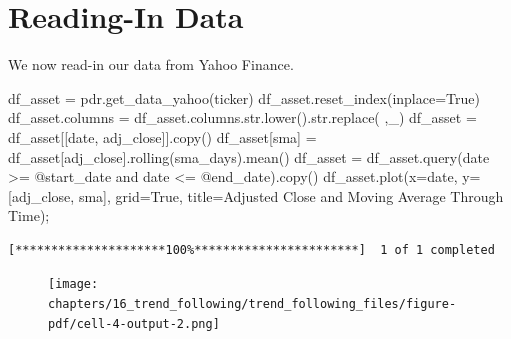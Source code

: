 \documentclass[
  letterpaper,
  DIV=11,
  numbers=noendperiod]{scrreprt}
\newenvironment{Shaded}{\begin{snugshade}}{\end{snugshade}}
\newcommand{\BuiltInTok}[1]{\textcolor[rgb]{0.00,0.23,0.31}{#1}}
\newcommand{\NormalTok}[1]{\textcolor[rgb]{0.00,0.23,0.31}{#1}}
\newcommand{\OperatorTok}[1]{\textcolor[rgb]{0.37,0.37,0.37}{#1}}
\newcommand{\StringTok}[1]{\textcolor[rgb]{0.13,0.47,0.30}{#1}}
\newcommand{\VariableTok}[1]{\textcolor[rgb]{0.07,0.07,0.07}{#1}}
\begin{document}
\hypertarget{reading-in-data-10}{%
\section{Reading-In Data}\label{reading-in-data-10}}

We now read-in our data from Yahoo Finance.

\begin{Shaded}
\begin{Highlighting}[]
\NormalTok{df\_asset }\OperatorTok{=}\NormalTok{ pdr.get\_data\_yahoo(ticker)}
\NormalTok{df\_asset.reset\_index(inplace}\OperatorTok{=}\VariableTok{True}\NormalTok{)}
\NormalTok{df\_asset.columns }\OperatorTok{=}\NormalTok{ df\_asset.columns.}\BuiltInTok{str}\NormalTok{.lower().}\BuiltInTok{str}\NormalTok{.replace(}\StringTok{\textquotesingle{} \textquotesingle{}}\NormalTok{,}\StringTok{\textquotesingle{}\_\textquotesingle{}}\NormalTok{)}
\NormalTok{df\_asset }\OperatorTok{=}\NormalTok{ df\_asset[[}\StringTok{\textquotesingle{}date\textquotesingle{}}\NormalTok{, }\StringTok{\textquotesingle{}adj\_close\textquotesingle{}}\NormalTok{]].copy()}
\NormalTok{df\_asset[}\StringTok{\textquotesingle{}sma\textquotesingle{}}\NormalTok{] }\OperatorTok{=}\NormalTok{ df\_asset[}\StringTok{\textquotesingle{}adj\_close\textquotesingle{}}\NormalTok{].rolling(sma\_days).mean()}
\NormalTok{df\_asset }\OperatorTok{=}\NormalTok{ df\_asset.query(}\StringTok{\textquotesingle{}date \textgreater{}= @start\_date and date \textless{}= @end\_date\textquotesingle{}}\NormalTok{).copy()}
\NormalTok{df\_asset.plot(x}\OperatorTok{=}\StringTok{\textquotesingle{}date\textquotesingle{}}\NormalTok{, y}\OperatorTok{=}\NormalTok{[}\StringTok{\textquotesingle{}adj\_close\textquotesingle{}}\NormalTok{, }\StringTok{\textquotesingle{}sma\textquotesingle{}}\NormalTok{], grid}\OperatorTok{=}\VariableTok{True}\NormalTok{, title}\OperatorTok{=}\StringTok{\textquotesingle{}Adjusted Close and Moving Average Through Time\textquotesingle{}}\NormalTok{)}\OperatorTok{;}
\end{Highlighting}
\end{Shaded}

\begin{verbatim}
[*********************100%***********************]  1 of 1 completed
\end{verbatim}

\begin{figure}[H]

{\centering \texttt{[image: chapters/16\_trend\_following/trend\_following\_files/figure-pdf/cell-4-output-2.png]}

}

\end{figure}
\end{document}

